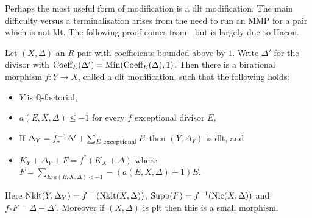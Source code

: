 Perhaps the most useful form of modification is a dlt modification. The main difficulty versus a terminalisation arises from the need to run an MMP for a pair which is not klt. The following proof comes from \cite[Theorem 10.4]{fujino2009fundamental}, but is largely due to Hacon.

\begin{theorem}\label{dlt-mod}
	Let $(X,\Delta)$ an $R$ pair with coefficients bounded above by $1$. Write $\Delta'$ for the divisor with $\textup{Coeff}_{E}(\Delta')=\textup{Min}(\textup{Coeff}_{E}(\Delta),1)$. Then there is a birational morphism $f\colon Y \to X$, called a dlt modification, such that the following holds:
	\begin{itemize}
		\item $Y$ is $\mathbb{Q}$-factorial,
		\item $a(E,X,\Delta) \leq -1$ for every $f$ exceptional divisor $E$,
		\item If $\Delta_{Y}=f^{-1}_{*}\Delta' + \sum_{E \textup{ exceptional}} E$ then $(Y,\Delta_{Y})$ is dlt, and
		\item $K_{Y}+\Delta_{Y}+F=f^{*}(K_{X}+\Delta)$ where $F= \sum_{E\colon a(E,X,\Delta)<-1} -(a(E,X,\Delta)+1)E$.
	\end{itemize}
	Here $\textup{Nklt}(Y,\Delta_{Y})=f^{-1}(\textup{Nklt}(X,\Delta))$, $\text{Supp}(F)=f^{-1}(\textup{Nlc}(X,\Delta))$ and $f_{*}F=\Delta-\Delta'$. Moreover if $(X,\Delta)$ is plt then this is a small morphism.
\end{theorem}

